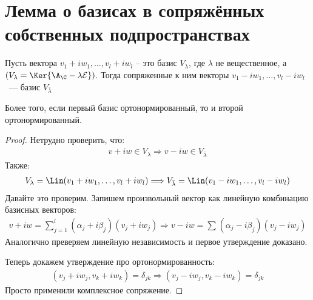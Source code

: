 \section{Лемма о базисах в сопряжённых собственных подпространствах}
\begin{lemma}
    Пусть вектора $v_1 + iw_1, \dots, v_l + iw_l$ -- это базис $V_{\lambda}$, где $\lambda$ не вещественное, а $(V_{\lambda} = \Ker{\A_{\C} - \lambda \mathcal{E}})$.
    Тогда сопряженные к ним векторы $v_1 - iw_1, \dots, v_l - iw_l$~--- базис $V_{\bar{\lambda}}$

    Более того, если первый базис ортонормированный, то и второй ортонормированный.
\end{lemma}


\begin{proof} \quad 
    
Нетрудно проверить, что:
\begin{gather*}
    v + iw \in V_{\lambda} \Longrightarrow v - iw \in V_{\bar{\lambda}}
\end{gather*}
Также:
\begin{gather*}
    V_{\lambda} = \Lin(v_1 + iw_1, \dots, v_l + iw_l) \Longrightarrow V_{\bar{\lambda}} = \Lin(v_1 - iw_1, \dots, v_l - iw_l)
\end{gather*}
Давайте это проверим. Запишем произвольный вектор как линейную комбинацию базисных векторов: 
\begin{gather*}
    v + iw = \sum_{j = 1}^{l} (\alpha_j + i \beta_j) (v_j + i w_j) \Longrightarrow v - iw = \sum_{}^{} (\alpha_j - i \beta_j) (v_j - i w_j)
\end{gather*}
Аналогично преверяем линейную независимость и первое утверждение доказано. 

Теперь докажем утверждение про ортонормированность:
\begin{gather*}
    (v_j + i w_j, v_k + iw_k) = \delta_{jk} \Longrightarrow  (v_j - i w_j, v_k - iw_k) = \delta_{jk}
\end{gather*}
Просто применили комплексное сопряжение.
\end{proof}